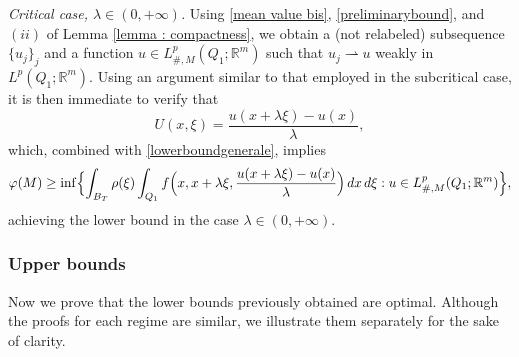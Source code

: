 \documentclass{article}
\theoremstyle{definition}
\newcommand{\f}{\varphi}
\newcommand{\R}{\mathbb{R}}
\begin{document}
\medskip

{\em Critical case, $\lambda\in(0,+\infty)$.} Using \eqref{mean value bis}, \eqref{preliminarybound}, and $(ii)$ of Lemma \ref{lemma : compactness}, we obtain a (not relabeled) subsequence $\{u_{j}\}_j$ and a function $u\in L^p_{\#,M}(Q_1; \R^m)$ such that $u_{j}\rightharpoonup u$ weakly in $L^p(Q_1; \R^m)$. Using an argument similar to that employed in the subcritical case, it is then immediate to verify that
\begin{equation*}
    U(x,\xi)=\frac{u(x+\lambda\xi)-u(x)}{\lambda},
\end{equation*}
which, combined with \eqref{lowerboundgenerale}, implies
\begin{equation*}
    \f(M)  \geq \inf\Bigl\{ \int_{B_T} \rho(\xi)\int_{Q_1} f\Bigl(x,x+\lambda\xi,\frac{u(x+\lambda\xi)-u(x)}{\lambda}\Bigr)\, dx\, d\xi : u\in L^p_{\#,M}(Q_1;\R^m) \Bigr\},
\end{equation*}
achieving the lower bound in the case $\lambda\in(0,+\infty)$.

\subsubsection{Upper bounds}

Now we prove that the lower bounds previously obtained are optimal. Although the proofs for each regime are similar, we illustrate them separately for the sake of clarity.
\end{document}
